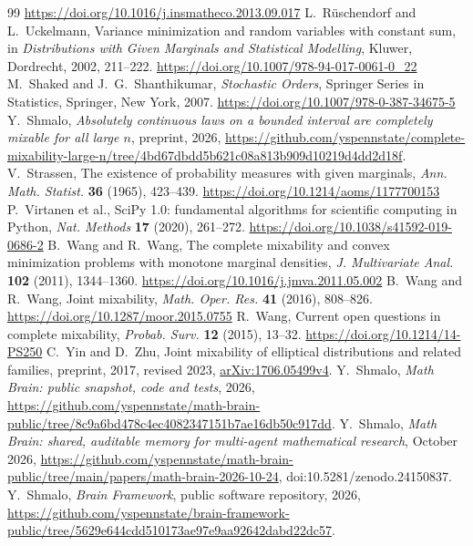 \documentclass[11pt]{amsart}
\theoremstyle{definition}
\begin{document}
\begin{thebibliography}{99}
\url{https://doi.org/10.1016/j.insmatheco.2013.09.017}
 L.~Rüschendorf and L.~Uckelmann, Variance minimization and random variables with constant sum, in
\emph{Distributions with Given Marginals and Statistical Modelling}, Kluwer, Dordrecht, 2002, 211--222.
\url{https://doi.org/10.1007/978-94-017-0061-0_22}
 M.~Shaked and J.~G.~Shanthikumar, \emph{Stochastic Orders}, Springer Series in Statistics, Springer,
New York, 2007. \url{https://doi.org/10.1007/978-0-387-34675-5}
 Y.~Shmalo, \emph{Absolutely continuous laws on a bounded interval are completely mixable for all large
$n$}, preprint, 2026,
\url{https://github.com/yspennstate/complete-mixability-large-n/tree/4bd67dbdd5b621c08a813b909d10219d4dd2d18f}.
 V.~Strassen, The existence of probability measures with given marginals, \emph{Ann. Math. Statist.}
\textbf{36} (1965), 423--439.
\url{https://doi.org/10.1214/aoms/1177700153}
 P.~Virtanen et al., SciPy 1.0: fundamental algorithms for scientific computing in Python, \emph{Nat.
Methods} \textbf{17} (2020), 261--272.
\url{https://doi.org/10.1038/s41592-019-0686-2}
 B.~Wang and R.~Wang, The complete mixability and convex minimization problems with monotone marginal
densities, \emph{J. Multivariate Anal.} \textbf{102} (2011), 1344--1360.
\url{https://doi.org/10.1016/j.jmva.2011.05.002}
 B.~Wang and R.~Wang, Joint mixability, \emph{Math. Oper. Res.} \textbf{41} (2016), 808--826.
\url{https://doi.org/10.1287/moor.2015.0755}
 R.~Wang, Current open questions in complete mixability, \emph{Probab. Surv.} \textbf{12} (2015),
13--32.
\url{https://doi.org/10.1214/14-PS250}
 C.~Yin and D.~Zhu, Joint mixability of elliptical distributions and related families, preprint, 2017, revised 2023,
\href{https://arxiv.org/abs/1706.05499v4}{arXiv:1706.05499v4}.
 Y.~Shmalo, \emph{Math Brain: public snapshot, code and tests}, 2026,
\url{https://github.com/yspennstate/math-brain-public/tree/8c9a6bd478c4ec4082347151b7ae16db50c917dd}.
 Y.~Shmalo, \emph{Math Brain: shared, auditable memory for multi-agent mathematical research},
October 2026, \url{https://github.com/yspennstate/math-brain-public/tree/main/papers/math-brain-2026-10-24},
doi:10.5281/zenodo.24150837.
 Y.~Shmalo, \emph{Brain Framework}, public software repository, 2026,
\url{https://github.com/yspennstate/brain-framework-public/tree/5629e644cdd510173ae97e9aa92642dabd22dc57}.
\end{thebibliography}
\end{document}
